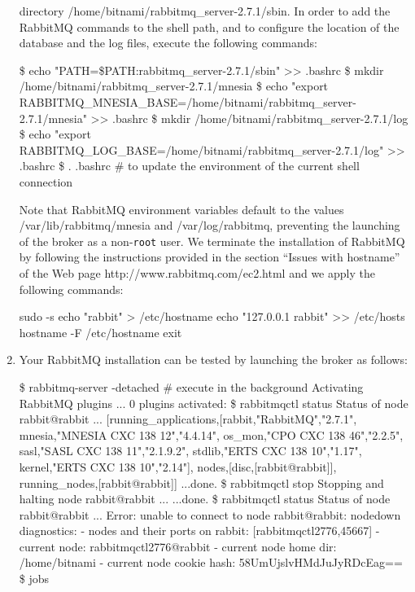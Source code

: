 \begin{enumerate}
directory \textsf{/home/bitnami/rabbitmq\_server-2.7.1/sbin}. In order
to add the RabbitMQ commands to the shell path, and to configure the
location of the database and the log files, execute the following
commands:
\begin{shellcmd}
\$ echo "PATH=\${PATH}:rabbitmq\_server-2.7.1/sbin" >> .bashrc
\$ mkdir /home/bitnami/rabbitmq\_server-2.7.1/mnesia
\$ echo "export RABBITMQ\_MNESIA\_BASE=/home/bitnami/rabbitmq\_server-2.7.1/mnesia" >> .bashrc
\$ mkdir /home/bitnami/rabbitmq\_server-2.7.1/log
\$ echo "export RABBITMQ\_LOG\_BASE=/home/bitnami/rabbitmq\_server-2.7.1/log" >> .bashrc
\$ . .bashrc \# to update the environment of the current shell connection
\end{shellcmd}
Note that RabbitMQ environment variables default to the values
\textsf{/var/lib/rabbitmq/mnesia} and \textsf{/var/log/rabbitmq},
preventing the launching of the broker as a non-\texttt{root} user.
We terminate the installation of RabbitMQ by following the
instructions provided in the section ``Issues with hostname'' of the
Web page \textsf{http://www.rabbitmq.com/ec2.html} and we apply the
following commands:
\begin{shellcmd}
sudo -s
echo "rabbit" > /etc/hostname
echo "127.0.0.1 rabbit" >> /etc/hosts
hostname -F /etc/hostname
exit
\end{shellcmd}
\item Your RabbitMQ installation can be tested by launching the broker
  as follows:
\begin{shellcmd}
\$ rabbitmq-server -detached \# execute in the background
Activating RabbitMQ plugins ...
0 plugins activated:
\$ rabbitmqctl status
Status of node rabbit@rabbit ...
[{running_applications,[{rabbit,"RabbitMQ","2.7.1"},
                        {mnesia,"MNESIA  CXC 138 12","4.4.14"},
                        {os\_mon,"CPO  CXC 138 46","2.2.5"},
                        {sasl,"SASL  CXC 138 11","2.1.9.2"},
                        {stdlib,"ERTS  CXC 138 10","1.17"},
                        {kernel,"ERTS  CXC 138 10","2.14"}]},
 {nodes,[{disc,[rabbit@rabbit]}]},
 {running\_nodes,[rabbit@rabbit]}]
...done.
\$ rabbitmqctl stop
Stopping and halting node rabbit@rabbit ...
...done.
\$ rabbitmqctl status
Status of node rabbit@rabbit ...
Error: unable to connect to node rabbit@rabbit: nodedown
diagnostics:
- nodes and their ports on rabbit: [{rabbitmqctl2776,45667}]
- current node: rabbitmqctl2776@rabbit
- current node home dir: /home/bitnami
- current node cookie hash: 58UmUjslvHMdJuJyRDcEag==
\$ jobs
\end{shellcmd}

\end{enumerate}
